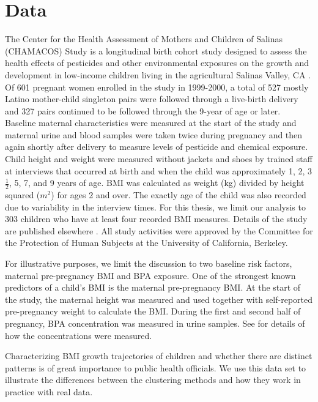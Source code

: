 \section{Data}
The Center for the Health Assessment of Mothers and Children of Salinas (CHAMACOS) Study is a longitudinal birth cohort study designed to assess the health effects of pesticides and other environmental exposures on the growth and development in low-income children living in the agricultural Salinas Valley, CA \cite{eskenazi2004,eskenazi2005}. Of 601 pregnant women enrolled in the study in 1999-2000, a total of 527 mostly Latino mother-child singleton pairs were followed through a live-birth delivery and 327 pairs continued to be followed through the 9-year of age or later. Baseline maternal characteristics were measured at the start of the study and maternal urine and blood samples were taken twice during pregnancy and then again shortly after delivery to measure levels of pesticide and chemical exposure. Child height and weight were measured without jackets and shoes by trained staff at interviews that occurred at birth and when the child was approximately 1, 2, 3 $\frac{1}{2}$, 5, 7, and 9 years of age. BMI was calculated as weight (kg) divided by height squared ($m^{2}$) for ages 2 and over. The exactly age of the child was also recorded due to variability in the interview times. For this thesis, we limit our analysis to 303 children who have at least four recorded BMI measures. Details of the study are published elsewhere \cite{eskenazi2003}. All study activities were approved by the Committee for the Protection of Human Subjects at the University of California, Berkeley. 

For illustrative purposes, we limit the discussion to two baseline risk factors, maternal pre-pregnancy BMI and BPA exposure. One of the strongest known predictors of a child's BMI is the maternal pre-pregnancy BMI. At the start of the study, the maternal height was measured and used together with self-reported pre-pregnancy weight to calculate the BMI. During the first and second half of pregnancy, BPA concentration was measured in urine samples. See \textcite{harley2013} for details of how the concentrations were measured.

Characterizing BMI growth trajectories of children and whether there are distinct patterns is of great importance to public health officials. We use this data set to illustrate the differences between the clustering methods and how they work in practice with real data.


